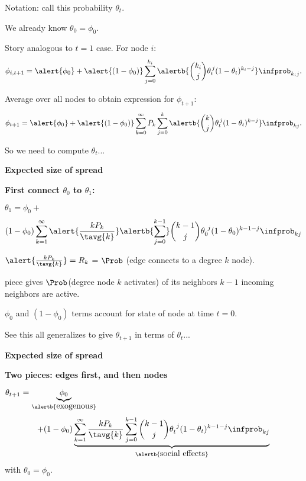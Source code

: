 {{{{    \alert{Notation:} call this probability $\theta_t$.
  
    We already know $\theta_0 = \phi_0$.
  
    Story analogous to $t=1$ case.  For node $i$:
    $$
    \phi_{i,t+1}
    = 
    \alert{\phi_{0}}
    + 
    \alert{(1-\phi_{0})}
    \sum_{j=0}^{k_i}
    \alertb{\binom{k_i}{j}
    \theta_t^{\, j}
    (1-\theta_t)^{k_i-j}}
    \infprob_{k_i j}.
    $$
  
    Average over all nodes to obtain expression for $\phi_{t+1}$:
    $$
    \phi_{t+1}
    = 
    \alert{\phi_{0}}
    + 
    \alert{(1-\phi_{0})}
    \sum_{k=0}^{\infty} P_k 
    \sum_{j=0}^{k}
    \alertb{\binom{k}{j}
    \theta_t^{\, j}
    (1-\theta_t)^{k-j}}
    \infprob_{kj}.
    $$
  
    So we need to compute $\theta_t$...  {}
  
  
  

  \textbf{Expected size of spread}
  
  \textbf{First connect $\theta_0$ to $\theta_1$:}
    
    
      $
      \theta_{1}
      =
      \phi_0 +
      $
      $$
      (1-\phi_0)
      \sum_{k=1}^{\infty}
      \alert{\frac{k P_k}{\tavg{k}}}
      \alertb{\sum_{j=0}^{k-1}}
      \binom{k-1}{j}
      \theta_{0}^{\ j}
      (1-\theta_{0})^{k-1-j}
      \infprob_{kj}
      $$
    
      $ \alert{\frac{kP_k}{\tavg{k}}} = R_k$ = $\Prob$ (edge connects to a degree $k$ node).
    
       piece gives $\Prob$(degree node $k$ activates)
      of its neighbors $k-1$ incoming neighbors are active.
    
      $\phi_0$ and $(1-\phi_0)$ terms account for state of node at time $t=0$.
    
      See this all generalizes to give $\theta_{t+1}$ in terms of $\theta_{t}$...
    
  

  \textbf{Expected size of spread}
  
  \textbf{Two pieces: edges first, and then nodes}
    
    
      $
      \theta_{t+1}
      =
      \underbrace{\phi_0}_{\alertb{\mbox{exogenous}}} 
      $
      $$
      +
      (1-\phi_0)
      \underbrace{
      \sum_{k=1}^{\infty}
      \frac{k P_k}{\tavg{k}}
      \sum_{j=0}^{k-1}
      \binom{k-1}{j}
      \theta_{t}^{\ j}
      (1-\theta_{t})^{k-1-j}
      \infprob_{kj}
      }_{\alertb{\mbox{social effects}}}
      $$
      with $\theta_0 = \phi_0$.
    
}}}}
